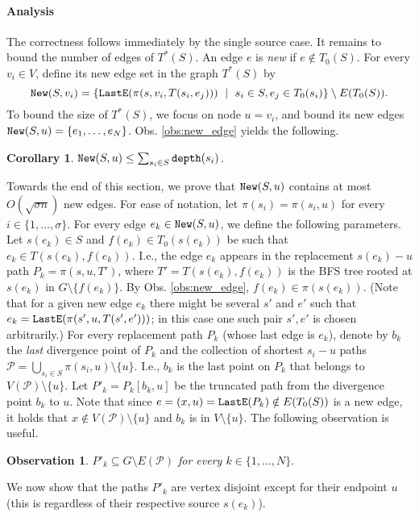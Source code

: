 \documentclass[12pt]{article}
\newtheorem{observation}[theorem]{Observation}
\newtheorem{corollary}[theorem]{Corollary}
\def\depth{\mbox{\tt depth}}
\newcommand{\New}[0]{\mbox{\tt New}}
\def\LastE{\mbox{\tt LastE}}
\def\NSource{\sigma}
\begin{document}
{\paragraph{Analysis}
The correctness follows immediately by the single source case.
It remains to bound the number of edges of $T^*(S)$.
An edge $e$ is \emph{new} if $e \notin  T_0(S)$.
For every $v_i \in V$, define its new edge set in the graph $T^*(S)$ by
$$\New(S,v_i)=\{\LastE(\pi(s, v_i, T(s_i, e_j)))~\mid~ s_i \in S, e_j \in T_0(s_i)\} \setminus E(T_0(S)).$$
To bound the size of $T^*(S)$, we focus on node $u=v_i$,
and bound its new edges $\New(S,u)=\{e_1, \ldots, e_N\}$.
Obs. \ref{obs:new_edge} yields the following.
\begin{corollary}
\label{cor:multi_depth}
$\New(S,u) \leq \sum_{s_i \in S} \depth(s_i)$.
\end{corollary}
Towards the end of this section, we prove that $\New(S,u)$ contains at most $O(\sqrt{\NSource n})$ new edges.
For ease of notation, let $\pi(s_i)=\pi(s_i, u)$ for every
$i \in \{1, \ldots, \NSource\}$. For every edge $e_k \in \New(S,u)$,
we define the following parameters. Let $s(e_k) \in S$ and
$f(e_k) \in T_0(s(e_k))$ be such that $e_k\in T(s(e_k), f(e_k))$.
I.e., the edge $e_k$ appears in the replacement $s(e_k)-u$ path
$P_k=\pi(s, u, T')$, where $T'=T(s(e_k), f(e_k))$ is
the BFS tree rooted at $s(e_k)$ in $G \setminus \{f(e_k)\}$.
By Obs. \ref{obs:new_edge}, $f(e_k) \in \pi(s(e_k))$.
(Note that for a given new edge $e_k$ there might be several $s'$
and $e'$ such that $e_k=\LastE(\pi(s', u, T(s',e')))$; in this case one such pair $s',e'$ is chosen arbitrarily.)
For every replacement path $P_k$ (whose last edge is $e_k$), denote by
$b_k$ the \emph{last} divergence point of $P_k$ and the collection of shortest
$s_i-u$ paths $\mathcal{P}=\bigcup_{s_i \in S} \pi(s_i,u) \setminus \{u\}$.
I.e., $b_k$ is the last point on $P_k$ that belongs to $V(\mathcal{P})\setminus \{u\}$.
Let $P'_k=P_k[b_k,u]$ be the truncated path from the divergence point $b_k$ to $u$.
Note that since $e=(x,u)=\LastE(P_k) \notin E(T_0(S))$ is a new edge,
it holds that $x \notin V(\mathcal{P})\setminus \{u\}$ and $b_k$ is
in $V \setminus \{u\}$.
The following observation is useful.
\begin{observation}
\label{obs:pathmulti}
$P'_k \subseteq G \setminus E(\mathcal{P})$ for every $k \in \{1, \ldots, N\}.$
\end{observation}
We now show that the paths $P'_k$ are vertex disjoint
except for their endpoint $u$ (this is regardless of their respective source
$s(e_k)$).
}
\end{document}
